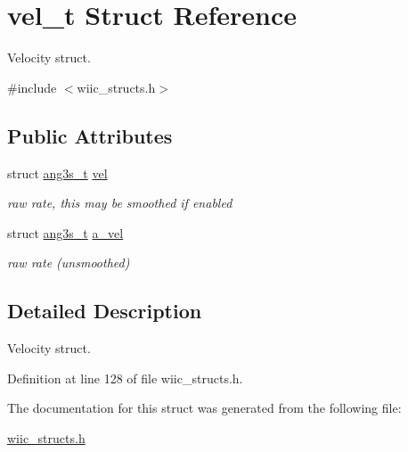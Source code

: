 \hypertarget{structvel__t}{\section{vel\-\_\-t \-Struct \-Reference}
\label{structvel__t}
}


\-Velocity struct.  




{\ttfamily \#include $<$wiic\-\_\-structs.\-h$>$}

\subsection*{\-Public \-Attributes}
\begin{DoxyCompactItemize}
\item 
\hypertarget{structvel__t_a76865c7b30e92bcae2097ec2b46aa692}{struct \hyperlink{structang3s__t}{ang3s\-\_\-t} \hyperlink{structvel__t_a76865c7b30e92bcae2097ec2b46aa692}{vel}}\label{structvel__t_a76865c7b30e92bcae2097ec2b46aa692}

\begin{DoxyCompactList}\small\item\em raw rate, this may be smoothed if enabled \end{DoxyCompactList}\item 
\hypertarget{structvel__t_a5443db069cfca456f3b8f5de9aaf1422}{struct \hyperlink{structang3s__t}{ang3s\-\_\-t} \hyperlink{structvel__t_a5443db069cfca456f3b8f5de9aaf1422}{a\-\_\-vel}}\label{structvel__t_a5443db069cfca456f3b8f5de9aaf1422}

\begin{DoxyCompactList}\small\item\em raw rate (unsmoothed) \end{DoxyCompactList}\end{DoxyCompactItemize}


\subsection{\-Detailed \-Description}
\-Velocity struct. 

\-Definition at line 128 of file wiic\-\_\-structs.\-h.



\-The documentation for this struct was generated from the following file\-:\begin{DoxyCompactItemize}
\item 
\hyperlink{wiic__structs_8h}{wiic\-\_\-structs.\-h}\end{DoxyCompactItemize}
